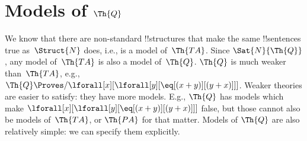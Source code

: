 \documentclass[../../../include/open-logic-section]{subfiles}
\begin{document}
\section{Models of $\Th{Q}$}

\begin{explain}
We know that there are non-standard !!{structure}s that make the same
!!{sentence}s true as~$\Struct{N}$ does, i.e., is a model
of~$\Th{TA}$. Since $\Sat{N}{\Th{Q}}$, any model of~$\Th{TA}$ is also
a model of~$\Th{Q}$. $\Th{Q}$ is much weaker than~$\Th{TA}$, e.g.,
$\Th{Q} \Proves/ \lforall[x][\lforall[y][\eq[(x +
      y)][(y+x)]]]$. Weaker theories are easier to satisfy: they have
more models. E.g., $\Th{Q}$ has models which make
$\lforall[x][\lforall[y][\eq[(x + y)][(y+x)]]]$ false, but those
cannot also be models of~$\Th{TA}$, or $\Th{PA}$ for that matter.
Models of $\Th{Q}$ are also relatively simple: we can specify them
explicitly.
\end{explain}
\end{document}
